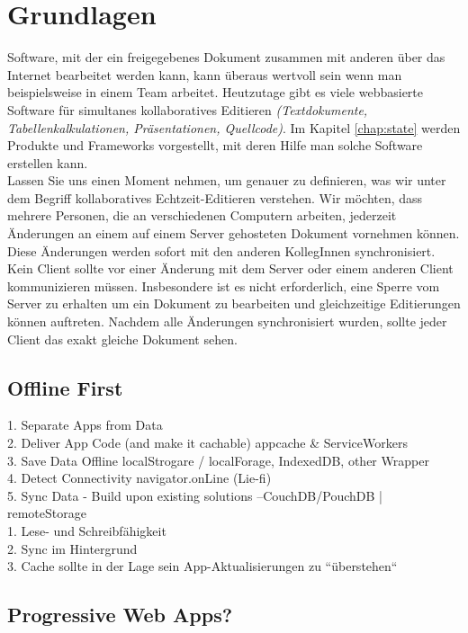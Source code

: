 \chapter{\label{chap:grundlagen}Grundlagen}
Software, mit der ein freigegebenes Dokument zusammen mit anderen über das Internet bearbeitet werden kann, kann überaus wertvoll sein wenn man beispielsweise in einem Team arbeitet. Heutzutage gibt es viele webbasierte Software für simultanes kollaboratives Editieren \textit{(Textdokumente, Tabellenkalkulationen, Präsentationen, Quellcode)}. Im Kapitel \ref{chap:state} werden Produkte und Frameworks vorgestellt, mit deren Hilfe man solche Software erstellen kann.\\
Lassen Sie uns einen Moment nehmen, um genauer zu definieren, was wir unter dem Begriff kollaboratives Echtzeit-Editieren verstehen.
Wir möchten, dass mehrere Personen, die an verschiedenen Computern arbeiten, jederzeit Änderungen an einem auf einem Server gehosteten Dokument vornehmen können. Diese Änderungen werden sofort mit den anderen KollegInnen synchronisiert. Kein Client sollte vor einer Änderung mit dem Server oder einem anderen Client kommunizieren müssen. Insbesondere ist es nicht erforderlich, eine Sperre vom Server zu erhalten um ein Dokument zu bearbeiten und gleichzeitige Editierungen können auftreten. Nachdem alle Änderungen synchronisiert wurden, sollte jeder Client das exakt gleiche Dokument sehen.

%
%
\section{Offline First}
1. Separate Apps from Data\\
2. Deliver App Code (and make it cachable) {appcache \& ServiceWorkers}\\
3. Save Data Offline {localStrogare / localForage, IndexedDB, other Wrapper}\\
4. Detect Connectivity {navigator.onLine} (Lie-fi)\\
5. Sync Data - Build upon existing solutions --CouchDB/PouchDB | remoteStorage\\
%
%
1. Lese- und Schreibfähigkeit\\
2. Sync im Hintergrund\\
3. Cache sollte in der Lage sein App-Aktualisierungen zu ``überstehen``
%
%
\section{Progressive Web Apps?}
%
%
